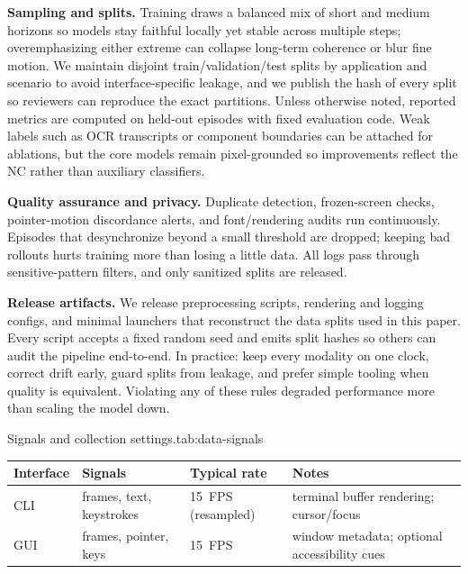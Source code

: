 \noindent\textbf{Sampling and splits.}
Training draws a balanced mix of short and medium horizons so models stay faithful locally yet stable across multiple steps; overemphasizing either extreme can collapse long-term coherence or blur fine motion. We maintain disjoint train/validation/test splits by application and scenario to avoid interface-specific leakage, and we publish the hash of every split so reviewers can reproduce the exact partitions. Unless otherwise noted, reported metrics are computed on held-out episodes with fixed evaluation code. Weak labels such as OCR transcripts or component boundaries can be attached for ablations, but the core models remain pixel-grounded so improvements reflect the NC rather than auxiliary classifiers.

\noindent\textbf{Quality assurance and privacy.}
Duplicate detection, frozen-screen checks, pointer-motion discordance alerts, and font/rendering audits run continuously. Episodes that desynchronize beyond a small threshold are dropped; keeping bad rollouts hurts training more than losing a little data. All logs pass through sensitive-pattern filters, and only sanitized splits are released.

\noindent\textbf{Release artifacts.}
We release preprocessing scripts, rendering and logging configs, and minimal launchers that reconstruct the data splits used in this paper. Every script accepts a fixed random seed and emits split hashes so others can audit the pipeline end-to-end. In practice: keep every modality on one clock, correct drift early, guard splits from leakage, and prefer simple tooling when quality is equivalent. Violating any of these rules degraded performance more than scaling the model down.

\begin{smallschemetable}{Signals and collection settings.}{tab:data-signals}
  \begin{tabularx}{\linewidth}{L{2.1cm} Y C{2.6cm} Y}
    \toprule
    Interface & Signals & Typical rate & Notes \\
    \midrule
    CLI & frames, text, keystrokes & 15~FPS (resampled) & terminal buffer rendering; cursor/focus \\
    GUI & frames, pointer, keys & 15~FPS & window metadata; optional accessibility cues \\
    \bottomrule
  \end{tabularx}
\end{smallschemetable}
